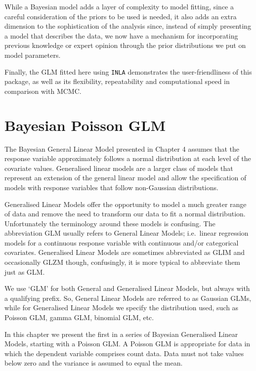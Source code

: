 \documentclass[
]{book}
\begin{document}
While a Bayesian model adds a layer of complexity to model fitting, since a careful consideration of the priors to be used is needed, it also adds an extra dimension to the sophistication of the analysis since, instead of simply presenting a model that describes the data, we now have a mechanism for incorporating previous knowledge or expert opinion through the prior distributions we put on model parameters.

Finally, the GLM fitted here using \texttt{INLA} demonstrates the user-friendliness of this package, as well as its flexibility, repeatability and computational speed in comparison with MCMC.

\hypertarget{pois-glm}{%
\chapter{Bayesian Poisson GLM}\label{pois-glm}}

The Bayesian General Linear Model presented in Chapter 4 assumes that the response variable approximately follows a normal distribution at each level of the covariate values. Generalised linear models are a larger class of models that represent an extension of the general linear model and allow the specification of models with response variables that follow non-Gaussian distributions.

Generalised Linear Models offer the opportunity to model a much greater range of data and remove the need to transform our data to fit a normal distribution. Unfortunately the terminology around these models is confusing. The abbreviation GLM usually refers to General Linear Models; i.e.~linear regression models for a continuous response variable with continuous and/or categorical covariates. Generalised Linear Models are sometimes abbreviated as GLIM and occasionally GLZM though, confusingly, it is more typical to abbreviate them just as GLM.

We use `GLM' for both General and Generalised Linear Models, but always with a qualifying prefix. So, General Linear Models are referred to as Gaussian GLMs, while for Generalised Linear Models we specify the distribution used, such as Poisson GLM, gamma GLM, binomial GLM, etc.

In this chapter we present the first in a series of Bayesian Generalised Linear Models, starting with a Poisson GLM. A Poisson GLM is appropriate for data in which the dependent variable comprises count data. Data must not take values below zero and the variance is assumed to equal the mean.
\end{document}
